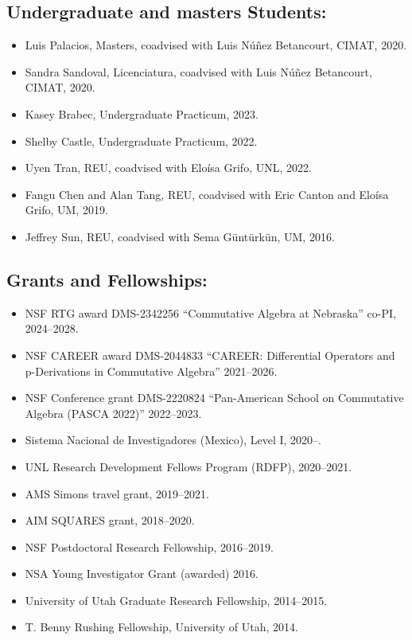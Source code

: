 \documentclass[12pt]{amsart}
\begin{document}
	
\subsection*{Undergraduate and masters Students:}
\begin{itemize}[leftmargin=9mm]
	\item Luis Palacios, Masters, coadvised with Luis N\'u\~nez Betancourt, CIMAT, 2020.
	\item Sandra Sandoval, Licenciatura, coadvised with Luis N\'u\~nez Betancourt, CIMAT, 2020.	
	\item Kasey Brabec, Undergraduate Practicum, 2023.
	\item Shelby Castle, Undergraduate Practicum, 2022.

	\item Uyen Tran, REU, coadvised with Elo\'isa Grifo, UNL, 2022.
	\item Fangu Chen and Alan Tang, REU, coadvised with Eric Canton and Elo\'isa Grifo, UM, 2019.
	\item Jeffrey Sun, REU, coadvised with Sema G\"unt\"urk\"un, UM, 2016.
\end{itemize}


\subsection*{Grants and Fellowships:}
\begin{itemize}[leftmargin=9mm]
\item NSF RTG award DMS-2342256 ``Commutative Algebra at Nebraska'' co-PI, 2024--2028.
	\item NSF CAREER award DMS-2044833 ``CAREER: Differential Operators and p-Derivations in Commutative Algebra'' 2021--2026.
	\item NSF Conference grant DMS-2220824 ``Pan-American School on Commutative Algebra (PASCA 2022)'' 2022--2023.
	\item Sistema Nacional de Investigadores (Mexico), Level I, 2020--.
	\item UNL Research Development Fellows Program (RDFP), 2020--2021.
	\item AMS Simons travel grant, 2019--2021.
	\item AIM SQUARES grant, 2018--2020.
	\item NSF Postdoctoral Research Fellowship, 2016--2019.
	\item NSA Young Investigator Grant (awarded) 2016.
	\item University of Utah Graduate Research Fellowship, 2014--2015.
	\item T. Benny Rushing Fellowship, University of Utah, 2014.
\end{itemize}
\end{document}
